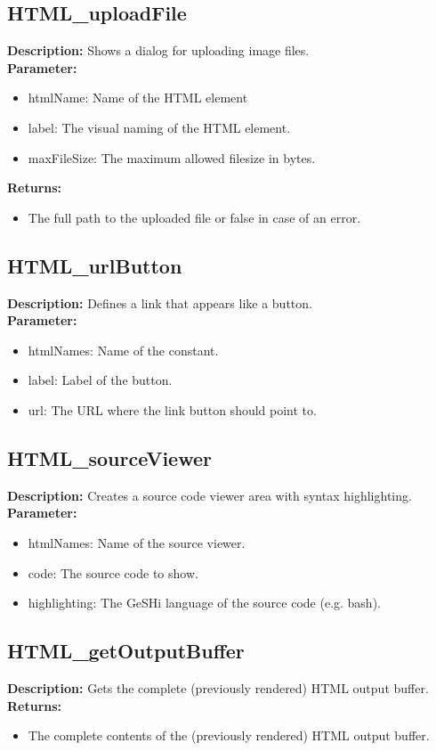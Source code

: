\subsection{HTML\_uploadFile}
\textbf{Description:} Shows a dialog for uploading image files.\\
\textbf{Parameter:}
\begin{itemize}
\item htmlName: Name of the HTML element
\item label: The visual naming of the HTML element.
\item maxFileSize: The maximum allowed filesize in bytes.
\end{itemize}
\textbf{Returns:}
\begin{itemize}
\item The full path to the uploaded file or false in case of an error.
\end{itemize}

\subsection{HTML\_urlButton}
\textbf{Description:} Defines a link that appears like a button.\\
\textbf{Parameter:}
\begin{itemize}
\item htmlNames: Name of the constant.
\item label: Label of the button.
\item url: The URL where the link button should point to.
\end{itemize}

\subsection{HTML\_sourceViewer}
\textbf{Description:} Creates a source code viewer area with syntax highlighting.\\
\textbf{Parameter:}
\begin{itemize}
\item htmlNames: Name of the source viewer.
\item code: The source code to show.
\item highlighting: The GeSHi language of the source code (e.g. bash).
\end{itemize}

\subsection{HTML\_getOutputBuffer}
\textbf{Description:} Gets the complete (previously rendered) HTML output buffer.\\
\textbf{Returns:}
\begin{itemize}
\item The complete contents of the (previously rendered) HTML output buffer.
\end{itemize}

